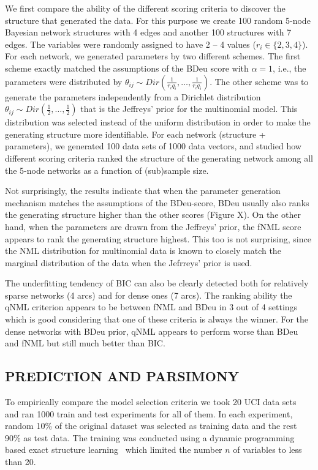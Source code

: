 We first compare the ability of the different scoring criteria to
discover the structure that generated the data. For this purpose we
create 100 random 5-node Bayesian network structures with 4
edges and another 100 structures with 7 edges.  The variables were
randomly assigned to have 2 -- 4 values ($r_i \in \{2, 3, 4\}$). For
each network, we generated parameters by two different schemes. The
first scheme exactly matched the assumptions of the BDeu score with
$\alpha = 1$, i.e., the parameters were distributed by $\theta_{ij}
\sim Dir(\frac{1}{r_iq_i},\ldots,\frac{1}{r_iq_i})$. The other scheme
was to generate the parameters independently from a Dirichlet
distribution $\theta_{ij} \sim Dir(\frac{1}{2},\ldots, \frac{1}{2})$
that is the Jeffreys' prior for the multinomial model. This distribution
was selected instead of the uniform distribution in order to make the
generating structure more identifiable.  For each network (structure +
parameters), we generated 100 data sets of 1000 data vectors, and
studied how different scoring criteria ranked the structure of the
generating network among all the 5-node networks as a function of
(sub)sample size.



Not surprisingly, the results indicate that when the parameter generation
mechanism matches the assumptions of the BDeu-score, BDeu usually
also ranks the generating structure higher than the other scores
(Figure X).  On the other hand, when the parameters are drawn from the
Jeffreys' prior, the fNML score appears to rank the generating structure
highest. This too is not surprising, since the NML distribution for
multinomial data is known to closely match the marginal distribution of
the data when the Jefrreys' prior is used.

The underfitting tendency of BIC can also be clearly detected both for
relatively sparse networks (4 arcs) and for dense ones (7 arcs). The
ranking ability the qNML criterion appears to be between fNML and BDeu
in 3 out of 4 settings which is good considering that one of these
criteria is always the winner. For the dense networks with BDeu prior,
qNML appears to perform worse than BDeu and fNML but still much
better than BIC.

\subsection{PREDICTION AND PARSIMONY}

To empirically compare the model selection criteria we took 20 UCI
data sets~\cite{Lichman:2013} and ran 1000 train and test experiments
for all of them. In each experiment, random 10\% of the original
dataset was selected as training data and the rest 90\% as test data.
The training was conducted using a dynamic programming based exact structure
learning~\cite{cosco.uai06} which limited the number $n$ of variables
to less than 20.

